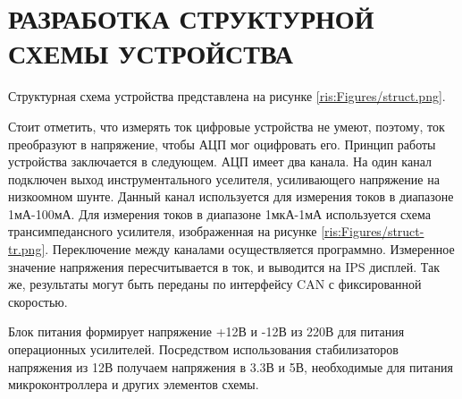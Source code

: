 \begin{sloppypar} %
\newpage %
\section{РАЗРАБОТКА СТРУКТУРНОЙ СХЕМЫ УСТРОЙСТВА} %
Структурная схема устройства представлена на рисунке \ref{ris:Figures/struct.png}.

Стоит отметить, что измерять ток цифровые устройства не умеют, поэтому, ток преобразуют в напряжение, чтобы АЦП мог оцифровать его. 
Принцип работы устройства заключается в следующем. АЦП имеет два канала. На один канал подключен выход инструментального уселителя, усиливающего напряжение на низкоомном шунте.  Данный канал используется для измерения токов в диапазоне 1мА-100мА. Для измерения токов в диапазоне 1мкА-1мА используется схема трансимпедансного усилителя\cite {CIRCUIT-CELLAR}, изображенная на рисунке \ref{ris:Figures/struct-tr.png}.
Переключение между каналами осуществляется программно.
Измеренное значение напряжения пересчитывается в ток, и выводится на IPS дисплей. Так же, результаты могут быть переданы по интерфейсу CAN с фиксированной скоростью.

Блок питания формирует напряжение +12В и -12В из 220В для питания операционных усилителей. Посредством использования стабилизаторов напряжения из 12В получаем напряжения в 3.3В и 5В, необходимые для питания микроконтроллера и других элементов схемы.


\end{sloppypar}
